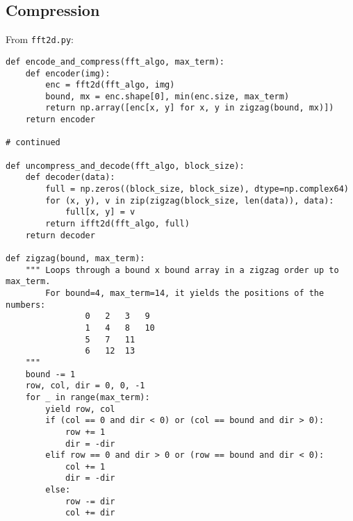 \subsection{Compression}
	\label{code:compression}
	From \verb|fft2d.py|:
	\begin{lstlisting}
def encode_and_compress(fft_algo, max_term):
    def encoder(img):
        enc = fft2d(fft_algo, img)
        bound, mx = enc.shape[0], min(enc.size, max_term)
        return np.array([enc[x, y] for x, y in zigzag(bound, mx)])
    return encoder

# continued

def uncompress_and_decode(fft_algo, block_size):
    def decoder(data):
        full = np.zeros((block_size, block_size), dtype=np.complex64)
        for (x, y), v in zip(zigzag(block_size, len(data)), data):
            full[x, y] = v
        return ifft2d(fft_algo, full)
    return decoder

def zigzag(bound, max_term):
    """ Loops through a bound x bound array in a zigzag order up to max_term.
        For bound=4, max_term=14, it yields the positions of the numbers:
                0   2   3   9
                1   4   8   10
                5   7   11
                6   12  13
    """
    bound -= 1
    row, col, dir = 0, 0, -1
    for _ in range(max_term):
        yield row, col
        if (col == 0 and dir < 0) or (col == bound and dir > 0):
            row += 1
            dir = -dir
        elif row == 0 and dir > 0 or (row == bound and dir < 0):
            col += 1
            dir = -dir
        else:
            row -= dir
            col += dir
	\end{lstlisting}
